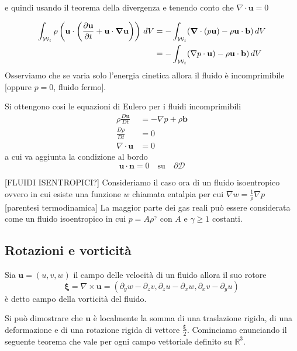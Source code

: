 e quindi usando il teorema della divergenza e tenendo conto che $\nabla \cdot \mathbf{u} = 0$

\begin{equation}
\begin{split}
\int_{\mathcal{W}_t} \rho \left ( \mathbf{u} \cdot \left ( \frac{\partial \mathbf{u}}{\partial t} + \mathbf{u} \cdot \boldsymbol{\nabla} \mathbf{u} \right )\right ) \, dV
 &= - \int_{\mathcal{W}_t} ( \boldsymbol{\nabla} \cdot (p\mathbf{u}) - \rho \mathbf{u} \cdot \mathbf{b}) \, dV \\
 &=  - \int_{\mathcal{W}_t} ( \nabla p  \cdot \mathbf{u}) - \rho \mathbf{u} \cdot \mathbf{b}) \, dV
\end{split}
\end{equation}
Osserviamo che se varia solo l'energia cinetica allora il fluido è incomprimibile [oppure $p=0$, fluido fermo].
 
Si ottengono cosi le equazioni di Eulero per i fluidi incomprimibili
\begin{equation}
\boxed{
\begin{aligned}
\rho \frac{D\mathbf{u}}{Dt} &= - \nabla p + \rho \mathbf{b} \\
\frac{D \rho }{Dt} &= 0 \\
\nabla \cdot \mathbf{u} &= 0
\end{aligned}
}
\end{equation}
a cui va aggiunta la condizione al bordo 
$$\mathbf{u} \cdot \mathbf{n} = 0 \quad \text{su} \quad \partial \mathcal{D}$$
 
[FLUIDI ISENTROPICI?]
Consideriamo il caso ora di un fluido isoentropico ovvero in cui esiste una funzione $w$ chiamata entalpia per cui
$\nabla w = \frac{1}{\rho} \nabla p$
[parentesi termodinamica]
La maggior parte dei gas reali può essere considerata come un fluido isoentropico in cui $p = A \rho ^ \gamma$ con $A$ e $\gamma \geq 1$ costanti.
 
\subsection{Rotazioni e vorticità}

Sia $\mathbf{u} = (u,v,w)$ il campo delle velocità di un fluido allora il suo rotore 
$$\boldsymbol{\xi} = \nabla \times \mathbf{u} = (\partial_y w - \partial_z v, \partial_z u - \partial_x w, \partial_x v - \partial_y u)$$
è detto campo della vorticità del fluido.

Si può dimostrare che $\mathbf{u}$ è localmente la somma di una traslazione rigida, di una deformazione e di una rotazione rigida di vettore $\frac{\boldsymbol{\xi}}{2}$. Cominciamo enunciando il seguente teorema che vale per ogni campo vettoriale definito su $\mathbb{R}^3$.

